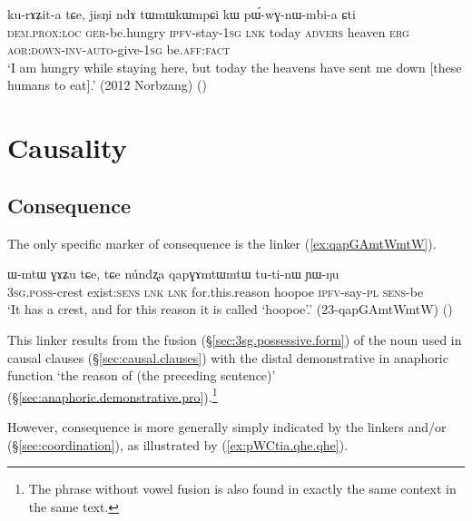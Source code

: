 \begin{exe}
\ex \label{ex:sAmtsMmtsWr.kurAZita}
 ku-rɤʑit-a tɕe, jisŋi ndɤ tɯmɯkɯmpɕi kɯ pɯ́-wɣ-nɯ-mbi-a ɕti  \\
\textsc{dem}.\textsc{prox}:\textsc{loc} \textsc{ger}-be.hungry \textsc{ipfv}-stay-\textsc{1sg} \textsc{lnk} today \textsc{advers} heaven \textsc{erg} \textsc{aor}:\textsc{down}-\textsc{inv}-\textsc{auto}-give-\textsc{1sg} be.\textsc{aff}:\textsc{fact} \\
\glt `I am hungry while staying here, but today the heavens have sent me down [these humans to eat].' (2012 Norbzang)
()
\end{exe}

 

 \section{Causality} \label{sec:causality}

 \subsection{Consequence} \label{sec:consequence}
 The only specific marker of consequence is the linker  (\ref{ex:qapGAmtWmtW}).

\begin{exe}
\ex \label{ex:qapGAmtWmtW}
\gll ɯ-mtɯ ɣɤʑu tɕe, tɕe núndʐa qapɣɤmtɯmtɯ tu-ti-nɯ ɲɯ-ŋu \\
\textsc{3sg}.\textsc{poss}-crest exist:\textsc{sens} \textsc{lnk} \textsc{lnk} for.this.reason hoopoe \textsc{ipfv}-say-\textsc{pl} \textsc{sens}-be \\
\glt `It has a crest, and for this reason it is called `hoopoe'.' (23-qapGAmtWmtW)
()
\end{exe}

This linker results from the fusion (§\ref{sec:3sg.possessive.form}) of the noun  used in causal clauses (§\ref{sec:causal.clauses}) with the distal demonstrative  in anaphoric function `the reason of (the preceding sentence)' (§\ref{sec:anaphoric.demonstrative.pro}).\footnote{The phrase  without vowel fusion is also found in exactly the same context in the same text. }

However, consequence is more generally simply indicated by the linkers  and/or  (§\ref{sec:coordination}), as illustrated by (\ref{ex:pWCtia.qhe.qhe}).

